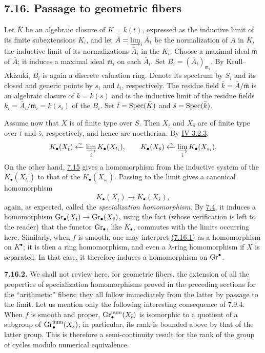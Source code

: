 
\subsection*{7.16. Passage to geometric fibers}
Let $\bar K$ be an algebraic closure of $K=k(t)$, expressed as the inductive
limit of its finite subextensions $K_i$, and let
$\bar A=\varinjlim_i\bar A_i$ be the normalization of $A$ in $\bar K$, the
inductive limit of its normalizations $\bar A_i$ in the $K_i$. Choose a
maximal ideal $\bar{\mathfrak m}$ of $\bar A$; it induces a maximal ideal
$\mathfrak m_i$ on each $\bar A_i$. Set
$B_i=(\bar A_i)_{\mathfrak m_i}$. By Krull--Akizuki, $B_i$ is again a
discrete valuation ring. Denote its spectrum by $S_i$ and its closed and
generic points by $s_i$ and $t_i$, respectively. The residue field
$\bar k=\bar A/\bar{\mathfrak m}$ is an algebraic closure of $k=k(s)$ and is
the inductive limit of the residue fields
$k_i=\bar A_i/\mathfrak m_i=k(s_i)$ of the $B_i$. Set
$\bar t=\operatorname{Spec}(\bar K)$ and $\bar s=\operatorname{Spec}(\bar k)$.

Assume now that $X$ is of finite type over $S$. Then $X_{\bar t}$ and
$X_{\bar s}$ are of finite type over $\bar t$ and $\bar s$, respectively,
and hence are noetherian. By \hyperlink{sga6.e04.para.3-2-3}{IV 3.2.3},
\[
K_\bullet(X_{\bar t})\xleftarrow{\sim}
  \varinjlim_i K_\bullet(X_{t_i}),
\qquad
K_\bullet(X_{\bar s})\xleftarrow{\sim}
  \varinjlim_i K_\bullet(X_{s_i}).
\]
On the other hand, \hyperlink{sga6.e10.sec.7.15}{7.15} gives a homomorphism from the inductive system of the
$K_\bullet(X_{t_i})$ to that of the $K_\bullet(X_{s_i})$. Passing to the
limit gives a canonical homomorphism
\begin{equation}\tag{7.16.1}
K_\bullet(X_{\bar t})\longrightarrow K_\bullet(X_{\bar s}),
\end{equation}
again, as expected, called the \emph{specialization homomorphism}. By
\hyperlink{sga6.e10.sec.7.4}{7.4}, it induces a homomorphism
$\operatorname{Gr}_\bullet(X_{\bar t})\to\operatorname{Gr}_\bullet(X_{\bar s})$, using the fact (whose
verification is left to the reader) that the functor $\operatorname{Gr}_\bullet$, like
$K_\bullet$, commutes with the limits occurring here. Similarly, when $f$
is smooth, one may interpret \hyperlink{sga6.e10.eq.7-16-1}{(7.16.1)} as a homomorphism on $K^\bullet$; it is
then a ring homomorphism, and even a $\lambda$-ring homomorphism if $X$ is
separated. In that case, it therefore induces a homomorphism on
$\operatorname{Gr}^\bullet$.

\textbf{7.16.2.}
We shall not review here, for geometric fibers, the extension of all the
properties of specialization homomorphisms proved in the preceding sections
for the ``arithmetic'' fibers; they all follow immediately from the latter
by passage to the limit. Let us mention only the following interesting
consequence of 7.9.4. When $f$ is smooth and proper,
$\operatorname{Gr}_\bullet^{\mathrm{num}}(X_{\bar t})$ is isomorphic to a quotient of a
subgroup of $\operatorname{Gr}_\bullet^{\mathrm{num}}(X_{\bar s})$; in particular, its
rank is bounded above by that of the latter group. This is therefore a
semi-continuity result for the rank of the group of cycles modulo numerical
equivalence.

